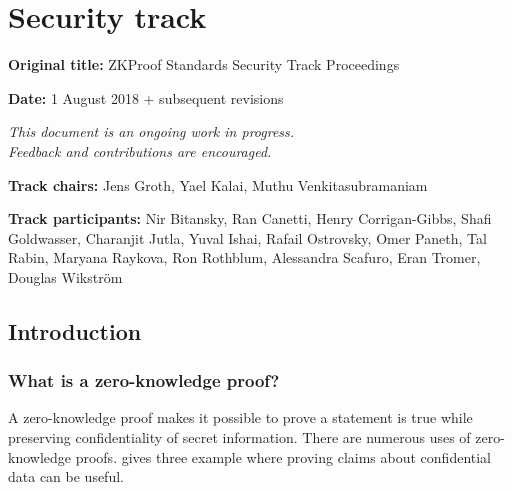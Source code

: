 \chapter{Security track}
\label{chap:track-security}

\vspace{2em}
\textbf{Original title:} ZKProof Standards Security Track Proceedings

\textbf{Date:} 1 August 2018 + subsequent revisions

{\itshape\centering
{\color{ongoingred} This document is an ongoing work in progress.}\\
{\color{ongoingred} Feedback and contributions are encouraged.}\\
}

\vspace{1em}
\textbf{Track chairs:} 
Jens Groth, Yael Kalai, Muthu Venkitasubramaniam

\textbf{Track participants:} 
Nir Bitansky, Ran Canetti, Henry Corrigan-Gibbs, Shafi Goldwasser, Charanjit Jutla, Yuval Ishai, Rafail Ostrovsky, Omer Paneth, Tal Rabin, Maryana Raykova, Ron Rothblum, Alessandra Scafuro, Eran Tromer, Douglas Wikström 



\section{Introduction}
\label{security:intro}



\subsection{What is a zero-knowledge proof?}
\label{security:intro:what-is-a-ZK}

	A zero-knowledge proof makes it possible to prove a statement is true while preserving confidentiality of secret information.
	There are numerous uses of zero-knowledge proofs. 
gives three example where proving claims about confidential data can be useful.
\loosen


